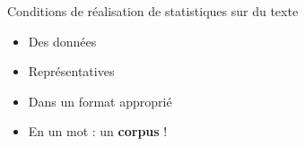 \documentclass[10pt]{beamer}
\begin{document}
\begin{frame}{Conditions de réalisation de statistiques sur du texte}
 \pause
\begin{itemize}
  \item Des données
  \item Représentatives
  \item Dans un format approprié
  \item En un mot : un \textbf{corpus} !
\end{itemize}





\end{frame}

\end{document}
